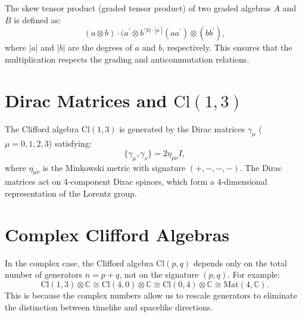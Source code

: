 \documentclass{article}
\begin{document}
The skew tensor product (graded tensor product) of two graded algebras $A$
and $B$ is defined as: 
\begin{equation*}
(a \otimes b) \cdot (a^{\prime }\otimes b^{\prime |b| \cdot |a^{\prime }|}
(a a^{\prime }) \otimes (b b^{\prime }), 
\end{equation*}
where $|a|$ and $|b|$ are the degrees of $a$ and $b$, respectively. This
ensures that the multiplication respects the grading and anticommutation
relations.

\section*{Dirac Matrices and $\text{Cl}(1, 3)$}

The Clifford algebra $\text{Cl}(1, 3)$ is generated by the Dirac matrices $%
\gamma_\mu$ ($\mu = 0, 1, 2, 3$) satisfying: 
\begin{equation*}
\{ \gamma_\mu, \gamma_\nu \} = 2 \eta_{\mu\nu} I, 
\end{equation*}
where $\eta_{\mu\nu}$ is the Minkowski metric with signature $(+, -, -, -)$.
The Dirac matrices act on 4-component Dirac spinors, which form a
4-dimensional representation of the Lorentz group.

\section*{Complex Clifford Algebras}

In the complex case, the Clifford algebra $\text{Cl}(p, q)$ depends only on
the total number of generators $n = p + q$, not on the signature $(p, q)$.
For example: 
\begin{equation*}
\text{Cl}(1, 3) \otimes \mathbb{C} \cong \text{Cl}(4, 0) \otimes \mathbb{C}
\cong \text{Cl}(0, 4) \otimes \mathbb{C} \cong \text{Mat}(4, \mathbb{C}). 
\end{equation*}
This is because the complex numbers allow us to rescale generators to
eliminate the distinction between timelike and spacelike directions.
\end{document}
